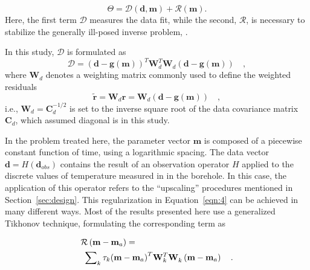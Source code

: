\documentclass[cp]{copernicus}
\begin{document}
\begin{equation}\label{eqn:4}
\Theta = \mathcal{D}\left(\mathbf{d},\mathbf{m}\right) + \mathcal{R}\left(\mathbf{m} \right).
\end{equation} 
\noindent Here, the first term $\mathcal{D}$ measures the data fit, while the second, 
$\mathcal{R}$, 
is necessary to stabilize the generally ill-posed inverse problem, \cite[see][]{Aster2019a}. 

In this study, $\mathcal{D}$ is formulated as
\begin{equation} 
\mathcal{D} = 
 \left(\mathbf{d} - \mathbf{g(m)}\right)^T \mathbf{W}_d^T 
 \mathbf{W}_d^{}\left(\mathbf{d} - \mathbf{g(m)} \right)\quad,
\end{equation} 
\noindent where $\mathbf{W}_d$ denotes a weighting matrix commonly used to define the weighted 
residuals 
\begin{equation*}
\tilde{ \mathbf{r}} =\mathbf{W}_d^{}\mathbf{r} = 
\mathbf{W}_d^{} \left(\mathbf{d}-\mathbf{g}(\mathbf{m})\right)\quad, 
\end{equation*}
\noindent i.e., $\mathbf{W}_d = \mathbf{C}_d^{-1/2}$ is set to the inverse square root of the data 
covariance matrix $\mathbf{C}_d$, which assumed diagonal is in this study. 

In the problem treated here, the parameter vector $\mathbf{m}$ is composed of a piecewise constant 
function of time, using a logarithmic spacing. The data vector $\mathbf{d} = H(\mathbf{d}_{obs})$ 
contains the result of an observation operator $H$ applied to the discrete values of temperature 
measured in in the borehole. In this case, the application of this operator refers to the 
“upscaling” procedures mentioned in Section~\ref{sec:design}. This regularization in 
Equation~\ref{eqn:4} can be achieved in many different ways. Most of the results presented here use 
a generalized Tikhonov technique, formulating the corresponding term as

\begin{equation}
\label{eqn:5}
\begin{gathered}
 \mathcal{R}\left( {{\mathbf{m}} - {{\mathbf{m}}_a}} \right) = \hfill \\
 {\text{ }}\sum\nolimits_k {{\tau _k}} {\left( {{\mathbf{m}} - {{\mathbf{m}}_a}} 
\right)^T}{\mathbf{W}}_k^T{\mathbf{W}}_k^{}\left( {{\mathbf{m}} - {{\mathbf{m}}_a}} \right) \quad. 
\hfill \\ 
\end{gathered} 
\end{equation} 
\end{document}
